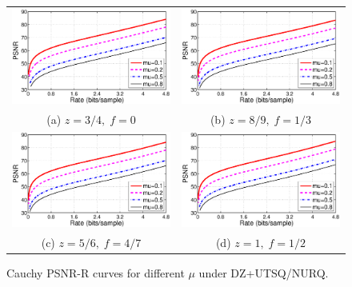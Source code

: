 \documentclass[smallabstract,smallcaptions]{dccpaper}
\begin{document}
\begin{figure}[tp]
\begin{center}
\begin{tabular}{cc}
\includegraphics[width = 0.5\linewidth]{Figures/section3/RD_Cauchy_z=0_75_p=0} &
\includegraphics[width = 0.5\linewidth]{Figures/section3/RD_Cauchy_z=0_89_p=0_33} \\
{\small (a) $z=3/4,\;f=0$} & {\small (b) $z=8/9,\;f=1/3$} \\
\includegraphics[width = 0.5\linewidth]{Figures/section3/RD_Cauchy_z=1_2_p=0_57} &
\includegraphics[width = 0.5\linewidth]{Figures/section3/RD_Cauchy_z=1_p=0_5} \\
{\small (c) $z=5/6,\;f=4/7$} & {\small (d) $z=1,\;f=1/2$} 
\end{tabular}
\end{center}
\vspace{-20pt}
\caption{\label{fig:RD_mu}
Cauchy PSNR-R curves for different $\mu$ under DZ+UTSQ/NURQ.}
\end{figure} 
\end{document}

